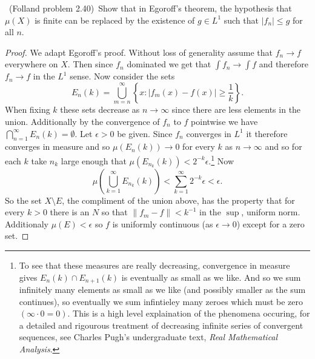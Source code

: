 \documentclass[11pt]{amsart}
\theoremstyle{definition}
\numberwithin{theorem}{section}
\numberwithin{definition}{section}
\numberwithin{equation}{section}
\newcommand{\set}[1]{ \left\{ #1 \right\} }
\def\suchthat{\mathrel{}:\mathrel{}}
\begin{document}
\medskip {}\ (Folland problem 2.40)\ 
Show that in Egoroff's theorem, the hypothesis that $\mu(X)$ is finite
can be replaced by the existence of $g\in L^1$ such that
$|f_n|\le g$ for all $n$.
\begin{proof}
	We adapt Egoroff's proof. Without loss of generality assume that $f_n 
	\to f$ everywhere on $X$. Then since $f_n$ dominated we get that $\int f_n \to \int f$ and 
	therefore $f_n \to f$ in the $L^1$ sense. Now consider the sets
	\begin{equation*}
		E_{n}(k) = \bigcup_{m=n}^\infty \set{x\suchthat |f_m(x) - f(x)| \geq \frac{1}{k}}.
	\end{equation*}
	When fixing $k$ these sets decrease as $n \to \infty$ since there are less elements in the union. Additionally 
	by the convergence of $f_n$ to $f$ pointwise we have $\bigcap_{n=1}^\infty E_n(k) = \emptyset.$  Let $\epsilon > 0$ be given. Since $f_n$ 
	converges in $L^1$ it therefore converges in measure and so $\mu(E_n(k)) \to 0$ for every $k$ as $n \to \infty$ and so for each $k$ take $n_k$ 
	large enough that $\mu(E_{n_k}(k)) < 2^{-k}\epsilon.$\footnote{To see that these measures are really decreasing, convergence in measure gives $E_{n}(k) \cap E_{n+1}(k)$ is eventually as small as we like. And so we sum infinitely many elements as small as we like (and possibly smaller as the sum continues), so eventually
	we sum infintieley many zeroes which must be zero $(\infty\cdot 0 = 0)$. This is a high level explaination of the phenomena occuring, for a detailed and rigourous treatment of decreasing infinite series of convergent sequences, see Charles Pugh's undergraduate text, \emph{Real Mathematical Analysis}.}
	Now $$\mu\left(\bigcup_{k=1}^\infty E_{n_k}(k)\right) < \sum_{k=1}^\infty 2^{-k}\epsilon < \epsilon.$$
	So the set $X \setminus E$, the compliment of the union above, has the property that for every $k > 0$ there is an $N$ so that $\|f_m -f\| < k^{-1}$ in
	the $\sup$, uniform norm. Additionaly $\mu(E) < \epsilon$ so $f$ is uniformly continuous (as $\epsilon \to 0$) except for a zero set.
\end{proof}
\end{document}

